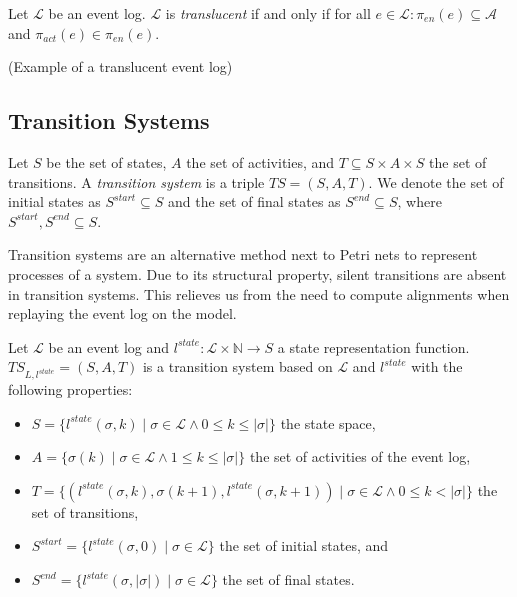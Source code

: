 \begin{definition}
    Let $\mathcal{L}$ be an event log. $\mathcal{L}$ is \emph{translucent} if and only if for all $e \in \mathcal{L}: \pi_{en}(e) \subseteq \mathcal{A}$ and $\pi_{act}(e) \in \pi_{en}(e)$.
\end{definition}

(Example of a translucent event log)

\subsection{Transition Systems}

\begin{definition}
    Let $S$ be the set of states, $A$ the set of activities, and $T \subseteq S \times A \times S$ the set of transitions. A \emph{transition system} is a triple $TS = (S, A, T)$. We denote the set of initial states as $S^{start} \subseteq S$ and the set of final states as $S^{end} \subseteq S$, where $S^{start}, S^{end} \subseteq S$.
\end{definition}

Transition systems are an alternative method next to Petri nets to represent processes of a system. Due to its structural property, silent transitions are absent in transition systems. This relieves us from the need to compute alignments when replaying the event log on the model.

\begin{definition}\label{def:pa}

    Let $\mathcal{L}$ be an event log and $l^{state}: \mathcal{L} \times \mathbb{N} \rightarrow S$ a state representation function. $TS_{L, l^{state}} = (S, A, T)$ is a transition system based on $\mathcal{L}$ and $l^{state}$ with the following properties:
    
    \begin{itemize}
        \item $S = \{l^{state}(\sigma, k) \mid \sigma \in \mathcal{L} \land 0 \leq k \leq \lvert \sigma \rvert \}$ the state space,
        \item $A = \{ \sigma(k) \mid \sigma \in \mathcal{L} \land 1 \leq k \leq \lvert \sigma \rvert \}$ the set of activities of the event log,
        \item $T = \{ (l^{state}(\sigma, k), \sigma(k+1), l^{state}(\sigma, k+1)) \mid \sigma \in \mathcal{L} \land 0 \leq k < \lvert \sigma \rvert \}$ the set of transitions,
        \item $S^{start} = \{ l^{state}(\sigma, 0) \mid \sigma \in \mathcal{L} \}$ the set of initial states, and
        \item $S^{end} = \{ l^{state}(\sigma, \lvert \sigma \rvert) \mid \sigma \in \mathcal{L} \}$ the set of final states.
    \end{itemize} 

\end{definition}

